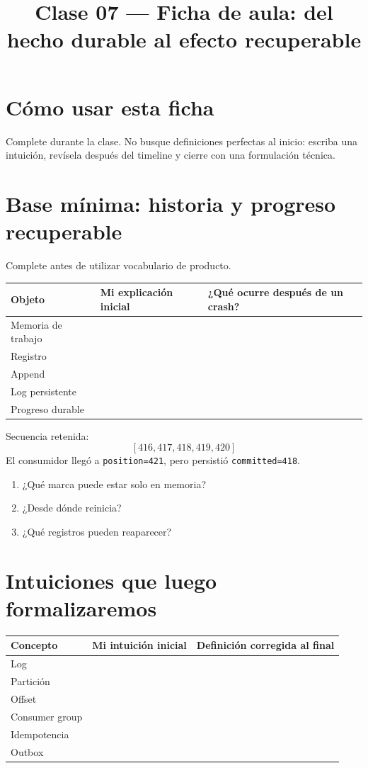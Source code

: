 \documentclass[variant=guia,cover=institutional,mode=print]{ua-engineering-v6-article}
\title{Clase 07 --- Ficha de aula: del hecho durable al efecto recuperable}
\author{\UAProfessor}
\date{\UADate}
\begin{document}
\maketitle
\section{Cómo usar esta ficha}
Complete durante la clase. No busque definiciones perfectas al inicio: escriba una intuición, revísela después del timeline y cierre con una formulación técnica.

\section{Base mínima: historia y progreso recuperable}

Complete antes de utilizar vocabulario de producto.

\begin{tabular}{p{}p{}p{}}
\toprule
Objeto & Mi explicación inicial & ¿Qué ocurre después de un crash? \\
\midrule
Memoria de trabajo & \rule{0pt}{0.9cm} & \\
Registro & \rule{0pt}{0.9cm} & \\
Append & \rule{0pt}{0.9cm} & \\
Log persistente & \rule{0pt}{0.9cm} & \\
Progreso durable & \rule{0pt}{0.9cm} & \\
\bottomrule
\end{tabular}

\vspace{0.4cm}
Secuencia retenida:
\[
[416,417,418,419,420]
\]
El consumidor llegó a \texttt{position=421}, pero persistió \texttt{committed=418}.

\begin{enumerate}
\item ¿Qué marca puede estar solo en memoria? \hrulefill
\item ¿Desde dónde reinicia? \hrulefill
\item ¿Qué registros pueden reaparecer? \hrulefill
\end{enumerate}

\section{Intuiciones que luego formalizaremos}
\begin{tabular}{p{}p{}p{}}
\toprule
Concepto & Mi intuición inicial & Definición corregida al final \\
\midrule
Log & \rule{0pt}{0.9cm} & \\
Partición & \rule{0pt}{0.9cm} & \\
Offset & \rule{0pt}{0.9cm} & \\
Consumer group & \rule{0pt}{0.9cm} & \\
Idempotencia & \rule{0pt}{0.9cm} & \\
Outbox & \rule{0pt}{0.9cm} & \\
\bottomrule
\end{tabular}
\end{document}
